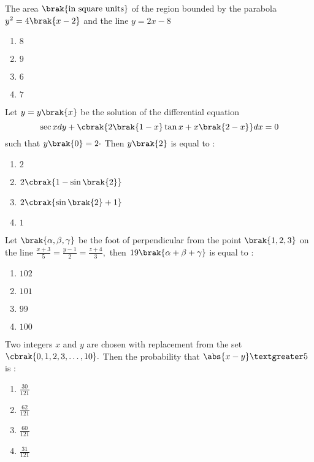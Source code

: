     \item The area $\brak{\text{in square units}}$ of the region bounded by the parabola $y^2=4\brak{x-2}$ and the line $y=2x-8$
	  \hfill{}  \\
    \begin{enumerate}
        \item $8$
        \item $9$
        \item $6$
        \item $7$
    \end{enumerate}
    \item Let $y=y\brak{x}$ be the solution of the differential equation $$\sec x dy +\cbrak{2\brak{1-x}\tan x +x\brak{2-x}}dx=0$$ such that $y\brak{0}=2\cdot$ Then $y\brak{2}$ is equal to $:$
	   \hfill{} \\
    \begin{enumerate}
        \item $2$
        \item $2\cbrak{1-\sin{\brak{2}}}$
        \item $2\cbrak{\sin{\brak{2}}+1}$
        \item $1$
    \end{enumerate}
    \item Let $\brak{\alpha,\beta,\gamma}$ be the foot of perpendicular from the point $\brak{1,2,3}$ on the line $\frac{x+3}{5}=\frac{y-1}{2}=\frac{z+4}{3},$ then $19\brak{\alpha+\beta+\gamma}$ is equal to $:$
	   \hfill{} \\
    \begin{enumerate}
        \item $102$
        \item $101$
        \item $99$
        \item $100$
    \end{enumerate}
    \item Two integers $x$ and $y$ are chosen with replacement from the set $\cbrak{0,1,2,3,\dots,10}.$ Then the probability that $\abs{x-y}\textgreater 5$ is $:$
	   \hfill{} \\
    \begin{enumerate}
        \item $\frac{30}{121}$
        \item $\frac{62}{121}$
        \item $\frac{60}{121}$
        \item $\frac{31}{121}$
    \end{enumerate}
